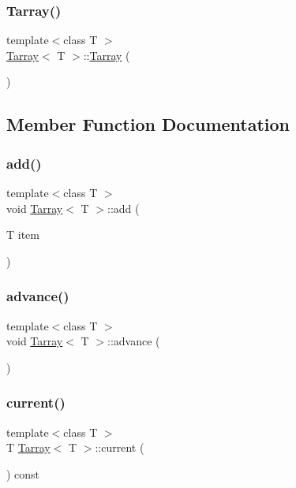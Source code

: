 \subsubsection{\texorpdfstring{Tarray()}{Tarray()}}
{\footnotesize\ttfamily template$<$class T $>$ \\
\hyperlink{class_tarray}{Tarray}$<$ T $>$\+::\hyperlink{class_tarray}{Tarray} (\begin{DoxyParamCaption}{ }\end{DoxyParamCaption})}



\subsection{Member Function Documentation}
\hypertarget{class_tarray_a973a89fb0a3fe40c1680f6cae63981ad}{}\label{class_tarray_a973a89fb0a3fe40c1680f6cae63981ad} 
\subsubsection{\texorpdfstring{add()}{add()}}
{\footnotesize\ttfamily template$<$class T $>$ \\
void \hyperlink{class_tarray}{Tarray}$<$ T $>$\+::add (\begin{DoxyParamCaption}\item[{T}]{item }\end{DoxyParamCaption})}

\hypertarget{class_tarray_a5bd5dd08f5bfe1c2a5dab59ad7896ecf}{}\label{class_tarray_a5bd5dd08f5bfe1c2a5dab59ad7896ecf} 
\subsubsection{\texorpdfstring{advance()}{advance()}}
{\footnotesize\ttfamily template$<$class T $>$ \\
void \hyperlink{class_tarray}{Tarray}$<$ T $>$\+::advance (\begin{DoxyParamCaption}{ }\end{DoxyParamCaption})}

\hypertarget{class_tarray_a60bc796c7843e2edaae82d42c15c4360}{}\label{class_tarray_a60bc796c7843e2edaae82d42c15c4360} 
\subsubsection{\texorpdfstring{current()}{current()}}
{\footnotesize\ttfamily template$<$class T $>$ \\
T \hyperlink{class_tarray}{Tarray}$<$ T $>$\+::current (\begin{DoxyParamCaption}{ }\end{DoxyParamCaption}) const}

